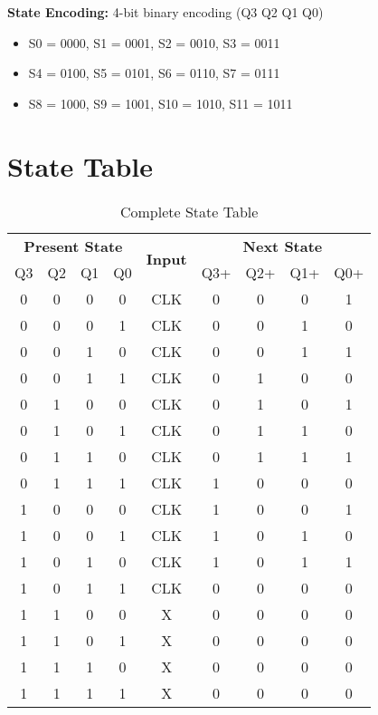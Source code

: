 \documentclass[12pt]{article}
\begin{document}
\textbf{State Encoding:} 4-bit binary encoding (Q3 Q2 Q1 Q0)
\begin{itemize}
    \item S0 = 0000, S1 = 0001, S2 = 0010, S3 = 0011
    \item S4 = 0100, S5 = 0101, S6 = 0110, S7 = 0111
    \item S8 = 1000, S9 = 1001, S10 = 1010, S11 = 1011
\end{itemize}

\section{State Table}

\begin{table}[H]
\centering
\caption{Complete State Table}
\begin{tabular}{|c|c|c|c|c|c|c|c|c|}
\hline
\multicolumn{4}{|c|}{\textbf{Present State}} & \multirow{2}{*}{\textbf{Input}} & \multicolumn{4}{|c|}{\textbf{Next State}} \\
\cline{1-4} \cline{6-9}
Q3 & Q2 & Q1 & Q0 & & Q3+ & Q2+ & Q1+ & Q0+ \\
\hline
0 & 0 & 0 & 0 & CLK & 0 & 0 & 0 & 1 \\
0 & 0 & 0 & 1 & CLK & 0 & 0 & 1 & 0 \\
0 & 0 & 1 & 0 & CLK & 0 & 0 & 1 & 1 \\
0 & 0 & 1 & 1 & CLK & 0 & 1 & 0 & 0 \\
0 & 1 & 0 & 0 & CLK & 0 & 1 & 0 & 1 \\
0 & 1 & 0 & 1 & CLK & 0 & 1 & 1 & 0 \\
0 & 1 & 1 & 0 & CLK & 0 & 1 & 1 & 1 \\
0 & 1 & 1 & 1 & CLK & 1 & 0 & 0 & 0 \\
1 & 0 & 0 & 0 & CLK & 1 & 0 & 0 & 1 \\
1 & 0 & 0 & 1 & CLK & 1 & 0 & 1 & 0 \\
1 & 0 & 1 & 0 & CLK & 1 & 0 & 1 & 1 \\
1 & 0 & 1 & 1 & CLK & 0 & 0 & 0 & 0 \\
1 & 1 & 0 & 0 & X & 0 & 0 & 0 & 0 \\
1 & 1 & 0 & 1 & X & 0 & 0 & 0 & 0 \\
1 & 1 & 1 & 0 & X & 0 & 0 & 0 & 0 \\
1 & 1 & 1 & 1 & X & 0 & 0 & 0 & 0 \\
\hline
\end{tabular}
\end{table}
\end{document}
